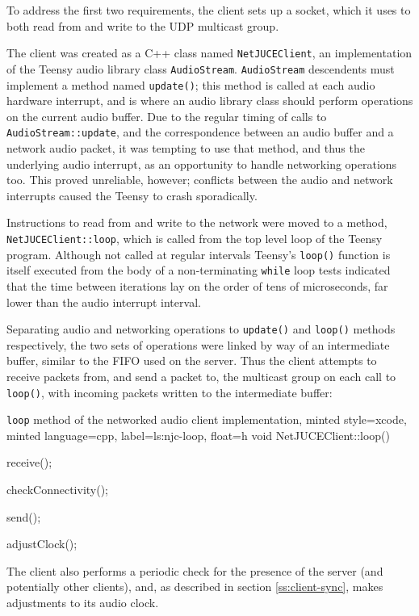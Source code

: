 To address the first two requirements, the client sets up a socket, which it
uses to both read from and write to the UDP multicast group.

The client was created as a C++ class named \texttt{NetJUCEClient}, an
implementation of the Teensy audio library class \texttt{AudioStream}.
\texttt{AudioStream} descendents must implement a method named
\texttt{update()}; this method is called at each audio hardware interrupt, and
is where an audio library class should perform operations on the current
audio buffer.
Due to the regular timing of calls to \texttt{AudioStream::update}, and the
correspondence between an audio buffer and a network audio packet, it was
tempting to use that method, and thus the underlying audio interrupt, as an
opportunity to handle networking operations too.
This proved unreliable, however; conflicts between the audio and network
interrupts caused the Teensy to crash sporadically.

Instructions to read from and write to the network were moved to a method,
\texttt{NetJUCEClient::loop}, which is called from the top level loop of
the Teensy program.
Although not called at regular intervals \textemdash{} Teensy's \texttt{loop()}
function is itself executed from the body of a non-terminating \texttt{while}
loop \textemdash{} tests indicated that the time between iterations lay on the
order of tens of microseconds, far lower than the audio interrupt interval.

Separating audio and networking operations to \texttt{update()} and
\texttt{loop()} methods respectively, the two sets of operations were linked
by way of an intermediate buffer, similar to the FIFO used on the server.
Thus the client attempts to receive packets from, and send a packet to, the
multicast group on each call to \texttt{loop()}, with incoming packets written
to the intermediate buffer:

\begin{codelisting}{
    \texttt{loop} method of the networked audio client implementation,
    minted style=xcode,
    minted language=cpp,
    label=ls:njc-loop,
    float=h
}
    void NetJUCEClient::loop() {
        receive();

        checkConnectivity();

        send();

        adjustClock();
    }
\end{codelisting}
\noindent
The client also performs a periodic check for the presence of the server (and
potentially other clients),
and, as described in section \ref{ss:client-sync}, makes adjustments to its
audio clock.

